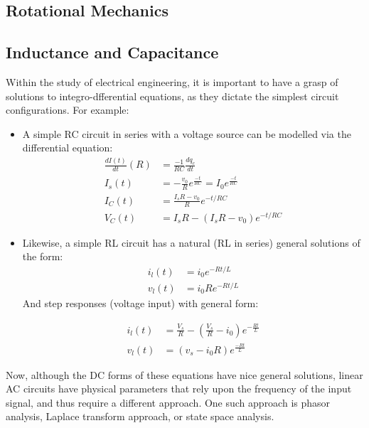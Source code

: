 \documentclass{book}
\begin{document}
\subsection{Rotational Mechanics}

	
\subsection{Inductance and Capacitance}

Within the study of electrical engineering, it is important to have a grasp of solutions to integro-dfferential equations, as they dictate the simplest circuit configurations. For example:

\begin{itemize}
	\item A simple RC circuit in series with a voltage source can be modelled via the differential equation:
	\begin{align*}
		\frac{dI(t)}{dt}(R) &= \frac{-1}{RC}\frac{dq_c}{dt} \\
		I_s(t) &= -\frac{v_0}{R} e^\frac{-t}{RC} = I_0 e^\frac{-t}{RC} \\
		I_C(t) &= \frac{I_sR-v_0}{R}e^{-t/RC}  \\
		V_C(t) &= I_s R - (I_s R - v_0 )e^{-t/RC}
	\end{align*}
	\item Likewise, a simple RL circuit has a natural (RL in series) general solutions of the form:
	\begin{align*}
		i_l(t) &= i_0 e^{-Rt/L} \\
		v_l(t) &= i_0 R e^{-Rt/L}
	\end{align*}
	And step responses (voltage input) with general form:
	
	\begin{align*}
		i_l(t) &= \frac{V_s}{R} - (\frac{V_s}{R} - i_0) e^{-\frac{Rt}{L}} \\
		v_l(t) &= (v_s - i_0 R)e^{\frac{-Rt}{L}}
	\end{align*}
\end{itemize}

Now, although the DC forms of these equations have nice general solutions, linear AC circuits have physical parameters that rely upon the frequency of the input signal, and thus require a different approach. One such approach is phasor analysis, Laplace transform approach, or state space analysis.
\end{document}
